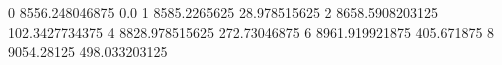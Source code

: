 0 8556.248046875 0.0
1 8585.2265625 28.978515625
2 8658.5908203125 102.3427734375
4 8828.978515625 272.73046875
6 8961.919921875 405.671875
8 9054.28125 498.033203125
